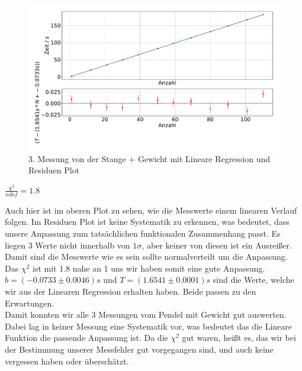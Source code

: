 \documentclass[twoside]{protokoll}
\begin{document}
\begin{figure}[H]
    \centering
    \includegraphics[width=1.0\textwidth]{plots/lineare_regression_gewicht_3.pdf}
    \caption{3. Messung von der Stange + Gewicht mit Lineare Regression und Residuen Plot}
\end{figure}
\begin{center}
    $ \frac{\chi^2}{ndof}  =  1.8$
\end{center}
Auch hier ist im oberen Plot zu sehen, wie die Messwerte einem linearen Verlauf folgen.
Im Residuen Plot ist keine Systematik zu erkennen, was bedeutet, dass unsere Anpassung zum tatsächlichen funktionalen Zusammenhang passt.
Es liegen 3 Werte nicht innerhalb von $1\sigma$, aber keiner von diesen ist ein Ausreißer. Damit sind die Messwerte wie es sein sollte normalverteilt um die Anpassung.
Das $\chi^2$ ist mit 1.8 nahe an 1 uns wir haben somit eine gute Anpassung. 
$b = ( -0.0733 \pm 0.0046)s$ und $T = (1.6541 \pm 0.0001)s$ sind die Werte, welche wir aus der Linearen Regression erhalten haben.
Beide passen zu den Erwartungen. \\

Damit konnten wir alle 3 Messungen vom Pendel mit Gewicht gut auswerten.
Dabei lag in keiner Messung eine Systematik vor, was bedeutet das die Lineare Funktion die passende Anpassung ist.
Da die $\chi^2$ gut waren, heißt es, das wir bei der Bestimmung unserer Messfehler gut vorgegangen sind, und auch keine vergessen haben oder überschätzt.
\end{document}

